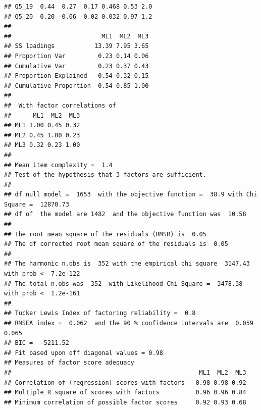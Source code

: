 \documentclass[
  man]{apa6}
\begin{document}
\begin{verbatim}
## Q5_19  0.44  0.27  0.17 0.468 0.53 2.0
## Q5_20  0.20 -0.06 -0.02 0.032 0.97 1.2
## 
##                         ML1  ML2  ML3
## SS loadings           13.39 7.95 3.65
## Proportion Var         0.23 0.14 0.06
## Cumulative Var         0.23 0.37 0.43
## Proportion Explained   0.54 0.32 0.15
## Cumulative Proportion  0.54 0.85 1.00
## 
##  With factor correlations of 
##      ML1  ML2  ML3
## ML1 1.00 0.45 0.32
## ML2 0.45 1.00 0.23
## ML3 0.32 0.23 1.00
## 
## Mean item complexity =  1.4
## Test of the hypothesis that 3 factors are sufficient.
## 
## df null model =  1653  with the objective function =  38.9 with Chi Square =  12870.73
## df of  the model are 1482  and the objective function was  10.58 
## 
## The root mean square of the residuals (RMSR) is  0.05 
## The df corrected root mean square of the residuals is  0.05 
## 
## The harmonic n.obs is  352 with the empirical chi square  3147.43  with prob <  7.2e-122 
## The total n.obs was  352  with Likelihood Chi Square =  3478.38  with prob <  1.2e-161 
## 
## Tucker Lewis Index of factoring reliability =  0.8
## RMSEA index =  0.062  and the 90 % confidence intervals are  0.059 0.065
## BIC =  -5211.52
## Fit based upon off diagonal values = 0.98
## Measures of factor score adequacy             
##                                                    ML1  ML2  ML3
## Correlation of (regression) scores with factors   0.98 0.98 0.92
## Multiple R square of scores with factors          0.96 0.96 0.84
## Minimum correlation of possible factor scores     0.92 0.93 0.68
\end{verbatim}
\end{document}
